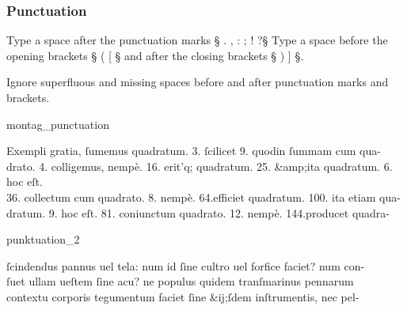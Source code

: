 \subsubsection{Punctuation}
\label{section latin punctuation}

\begin{mainrule}
Type a space after the punctuation marks § . , : ; ! ?§ \quad
Type a space before the opening brackets § ( [ § and after the closing brackets  § ) ] §.
\end{mainrule}

\begin{clarification}
Ignore superfluous and missing spaces before and after punctuation marks and brackets.
\end{clarification}

\vspace{2mm}
\begin{sampleImage}{montag_punctuation}
\begin{typeLatin}
Exempli gratia, ſumemus quadratum. 3. ſcilicet 9. quod\lwr in ſummam cum qua- \\
drato. 4. colligemus, nempè. 16. erit\bs'q; quadratum. 25. &amp;\lwr ita quadratum. 6. hoc eſt. \\
36. collectum cum quadrato. 8. nempè. 64.\lwr efficiet quadratum. 100. ita etiam qua- \\
dratum. 9. hoc eſt. 81. coniunctum quadrato. 12. nempè. 144.\lwr producet quadra-  \\
\someText {}
\end{typeLatin}
\end{sampleImage}

\begin{sampleImage}{punktuation_2}
\begin{typeLatin}
 \someText
ſcindendus pannus uel tela: num id ſine cultro uel forfice faciet? num con- \\
ſuet ullam ueſtem ſine acu? ne populus quidem tranſmarinus pennarum \\
contextu corporis tegumentum faciet ſine &ij;ſdem inſtrumentis, nec pel- \\
\someText {}
\end{typeLatin}
\end{sampleImage}


